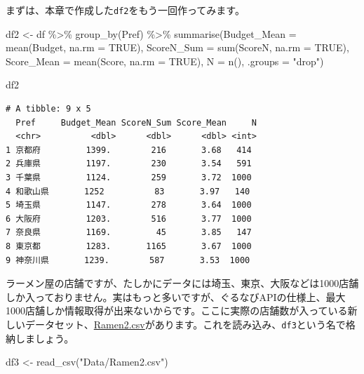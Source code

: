 \documentclass[
  a4paper,
  pandoc,
  ja=standard,
  jafont=haranoaji]{bxjsbook}
\newenvironment{Shaded}{\begin{snugshade}}{\end{snugshade}}
\newcommand{\AttributeTok}[1]{\textcolor[rgb]{0.00,0.48,0.65}{#1}}
\newcommand{\ConstantTok}[1]{\textcolor[rgb]{0.56,0.35,0.01}{#1}}
\newcommand{\FunctionTok}[1]{\textcolor[rgb]{0.28,0.35,0.67}{#1}}
\newcommand{\NormalTok}[1]{\textcolor[rgb]{0.00,0.48,0.65}{#1}}
\newcommand{\OtherTok}[1]{\textcolor[rgb]{0.00,0.48,0.65}{#1}}
\newcommand{\SpecialCharTok}[1]{\textcolor[rgb]{0.37,0.37,0.37}{#1}}
\newcommand{\StringTok}[1]{\textcolor[rgb]{0.13,0.47,0.30}{#1}}
\begin{document}
まずは、本章で作成した\texttt{df2}をもう一回作ってみます。

\begin{Shaded}
\begin{Highlighting}[numbers=left,,]
\NormalTok{df2 }\OtherTok{\textless{}{-}}\NormalTok{ df }\SpecialCharTok{\%\textgreater{}\%}
  \FunctionTok{group\_by}\NormalTok{(Pref) }\SpecialCharTok{\%\textgreater{}\%}
  \FunctionTok{summarise}\NormalTok{(}\AttributeTok{Budget\_Mean =} \FunctionTok{mean}\NormalTok{(Budget, }\AttributeTok{na.rm =} \ConstantTok{TRUE}\NormalTok{),}
            \AttributeTok{ScoreN\_Sum  =} \FunctionTok{sum}\NormalTok{(ScoreN, }\AttributeTok{na.rm =} \ConstantTok{TRUE}\NormalTok{),}
            \AttributeTok{Score\_Mean  =} \FunctionTok{mean}\NormalTok{(Score, }\AttributeTok{na.rm =} \ConstantTok{TRUE}\NormalTok{),}
            \AttributeTok{N           =} \FunctionTok{n}\NormalTok{(),}
            \AttributeTok{.groups     =} \StringTok{"drop"}\NormalTok{)}

\NormalTok{df2}
\end{Highlighting}
\end{Shaded}

\begin{verbatim}
# A tibble: 9 x 5
  Pref     Budget_Mean ScoreN_Sum Score_Mean     N
  <chr>          <dbl>      <dbl>      <dbl> <int>
1 京都府         1399.        216       3.68   414
2 兵庫県         1197.        230       3.54   591
3 千葉県         1124.        259       3.72  1000
4 和歌山県       1252          83       3.97   140
5 埼玉県         1147.        278       3.64  1000
6 大阪府         1203.        516       3.77  1000
7 奈良県         1169.         45       3.85   147
8 東京都         1283.       1165       3.67  1000
9 神奈川県       1239.        587       3.53  1000
\end{verbatim}

ラーメン屋の店舗ですが、たしかにデータには埼玉、東京、大阪などは1000店舗しか入っておりません。実はもっと多いですが、ぐるなびAPIの仕様上、最大1000店舗しか情報取得が出来ないからです。ここに実際の店舗数が入っている新しいデータセット、\href{Data/Ramen2.csv}{Ramen2.csv}があります。これを読み込み、\texttt{df3}という名で格納しましょう。

\begin{Shaded}
\begin{Highlighting}[numbers=left,,]
\NormalTok{df3 }\OtherTok{\textless{}{-}} \FunctionTok{read\_csv}\NormalTok{(}\StringTok{"Data/Ramen2.csv"}\NormalTok{)}
\end{Highlighting}
\end{Shaded}
\end{document}
